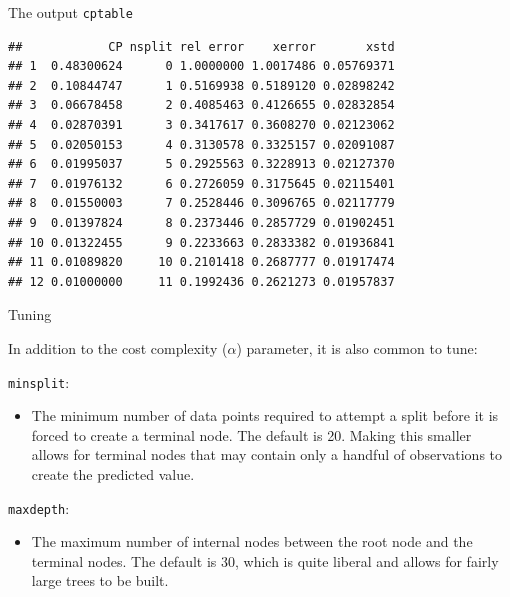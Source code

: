 \documentclass[
  10pt,
  ignorenonframetext,
]{beamer}
\newenvironment{Shaded}{}{}
\newcommand{\NormalTok}[1]{#1}
\newcommand{\OperatorTok}[1]{#1}
\providecommand{\tightlist}{%
  \setlength{\itemsep}{0pt}\setlength{\parskip}{0pt}}
\begin{document}
\begin{frame}[fragile]{The output \texttt{cptable}}
\protect\hypertarget{the-output-cptable}{}

\begin{Shaded}
\end{Shaded}

\begin{verbatim}
##            CP nsplit rel error    xerror       xstd
## 1  0.48300624      0 1.0000000 1.0017486 0.05769371
## 2  0.10844747      1 0.5169938 0.5189120 0.02898242
## 3  0.06678458      2 0.4085463 0.4126655 0.02832854
## 4  0.02870391      3 0.3417617 0.3608270 0.02123062
## 5  0.02050153      4 0.3130578 0.3325157 0.02091087
## 6  0.01995037      5 0.2925563 0.3228913 0.02127370
## 7  0.01976132      6 0.2726059 0.3175645 0.02115401
## 8  0.01550003      7 0.2528446 0.3096765 0.02117779
## 9  0.01397824      8 0.2373446 0.2857729 0.01902451
## 10 0.01322455      9 0.2233663 0.2833382 0.01936841
## 11 0.01089820     10 0.2101418 0.2687777 0.01917474
## 12 0.01000000     11 0.1992436 0.2621273 0.01957837
\end{verbatim}

\end{frame}

\begin{frame}[fragile]{Tuning}
\protect\hypertarget{tuning}{}

In addition to the cost complexity (\(\alpha\)) parameter, it is also
common to tune:

\begin{block}{\texttt{minsplit}:}

\begin{itemize}
\tightlist
\item
  The minimum number of data points required to attempt a split before
  it is forced to create a terminal node. The default is 20. Making this
  smaller allows for terminal nodes that may contain only a handful of
  observations to create the predicted value.
\end{itemize}

\end{block}

\begin{block}{\texttt{maxdepth}:}

\begin{itemize}
\tightlist
\item
  The maximum number of internal nodes between the root node and the
  terminal nodes. The default is 30, which is quite liberal and allows
  for fairly large trees to be built.
\end{itemize}

\end{block}

\end{frame}
\end{document}
